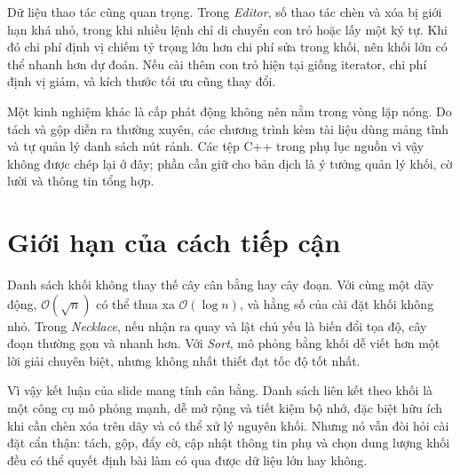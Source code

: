 \documentclass[11pt]{article}
\newcommand{\Oh}{\mathcal{O}}
\begin{document}
Dữ liệu thao tác cũng quan trọng. Trong \textit{Editor}, số thao tác chèn và
xóa bị giới hạn khá nhỏ, trong khi nhiều lệnh chỉ di chuyển con trỏ hoặc lấy
một ký tự. Khi đó chi phí định vị chiếm tỷ trọng lớn hơn chi phí sửa trong
khối, nên khối lớn có thể nhanh hơn dự đoán. Nếu cài thêm con trỏ hiện tại
giống iterator, chi phí định vị giảm, và kích thước tối ưu cũng thay đổi.

Một kinh nghiệm khác là cấp phát động không nên nằm trong vòng lặp nóng. Do
tách và gộp diễn ra thường xuyên, các chương trình kèm tài liệu dùng mảng
tĩnh và tự quản lý danh sách nút rảnh. Các tệp C++ trong phụ lục nguồn vì vậy
không được chép lại ở đây; phần cần giữ cho bản dịch là ý tưởng quản lý khối,
cờ lười và thông tin tổng hợp.

\section{Giới hạn của cách tiếp cận}

Danh sách khối không thay thế cây cân bằng hay cây đoạn. Với cùng một dãy
động, \(\Oh(\sqrt n)\) có thể thua xa \(\Oh(\log n)\), và hằng số của cài đặt
khối không nhỏ. Trong \textit{Necklace}, nếu nhận ra quay và lật chủ yếu là
biến đổi tọa độ, cây đoạn thường gọn và nhanh hơn. Với \textit{Sort}, mô
phỏng bằng khối dễ viết hơn một lời giải chuyên biệt, nhưng không nhất thiết
đạt tốc độ tốt nhất.

Vì vậy kết luận của slide mang tính cân bằng. Danh sách liên kết theo khối là
một công cụ mô phỏng mạnh, dễ mở rộng và tiết kiệm bộ nhớ, đặc biệt hữu ích
khi cần chèn xóa trên dãy và có thể xử lý nguyên khối. Nhưng nó vẫn đòi hỏi
cài đặt cẩn thận: tách, gộp, đẩy cờ, cập nhật thông tin phụ và chọn dung lượng
khối đều có thể quyết định bài làm có qua được dữ liệu lớn hay không.
\end{document}
